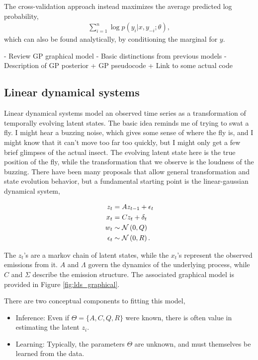 \documentclass[14pt]{extreport}
\begin{document}
The cross-validation approach instead maximizes the average predicted log probability,
\begin{align*}
\sum_{i = 1}^{n} \log p\left(y_{i} \vert x, y_{-i}; \theta\right),
\end{align*}
which can also be found analytically, by conditioning the marginal for $y$.

- Review GP graphical model
- Basic distinctions from previous models
- Description of GP posterior
  + GP pseudocode
  + Link to some actual code

\subsection{Linear dynamical systems}
\label{subsec:linear_dynamical_systems}

Linear dynamical systems model an observed time series as a transformation of
temporally evolving latent states. The basic idea reminds me of trying to swat a
fly. I might hear a buzzing noise, which gives some sense of where the fly is,
and I might know that it can't move too far too quickly, but I might only get a
few brief glimpses of the actual insect. The evolving latent state here is the
true position of the fly, while the transformation that we observe is the
loudness of the buzzing. There have been many proposals that allow general
transformation and state evolution behavior, but a fundamental starting point is
the linear-gaussian dynamical system,

\begin{align*}
  z_{t} &= A z_{t - 1} + \epsilon_{t} \\
  x_{t} &= C z_{t} + \delta_{t} \\
  w_{t} &\sim \mathcal{N}\left(0, Q\right) \\
  \epsilon_{t} &\sim \mathcal{N}\left(0, R\right).
\end{align*}

The $z_{t}$'s are a markov chain of latent states, while the $x_{t}$'s represent
the observed emissions from it. $A$ and $\Lambda$ govern the dynamics of the
underlying process, while $C$ and $\Sigma$ describe the emission structure. The
associated graphical model is provided in Figure \ref{fig:lds_graphical}.

There are two conceptual components to fitting this model,

\begin{itemize}
\item Inference: Even if $\Theta = \{A, C, Q, R\}$ were known, there
  is often value in estimating the latent $z_{i}$.
\item Learning: Typically, the parameters $\Theta$ are unknown, and must
  themselves be learned from the data.
\end{itemize}
\end{document}
